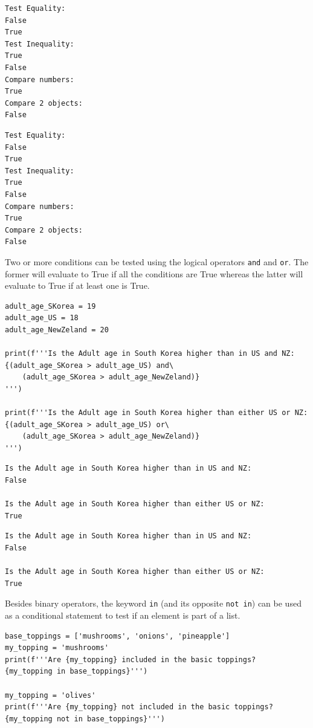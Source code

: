 \documentclass[10pt]{book}
\begin{document}
\label{org159f3d7}
\begin{verbatim}
Test Equality:
False
True
Test Inequality:
True
False
Compare numbers:
True
Compare 2 objects:
False
\end{verbatim}

\label{orgdbfd2e8}
\begin{verbatim}
Test Equality:
False
True
Test Inequality:
True
False
Compare numbers:
True
Compare 2 objects:
False
\end{verbatim}

Two or more conditions can be tested using the logical operators \texttt{and} and \texttt{or}. The former will evaluate to True if all the conditions are True whereas the latter will evaluate to True if at least one is True.

\label{org6384ff9}
\begin{verbatim}
adult_age_SKorea = 19
adult_age_US = 18
adult_age_NewZeland = 20

print(f'''Is the Adult age in South Korea higher than in US and NZ:
{(adult_age_SKorea > adult_age_US) and\
    (adult_age_SKorea > adult_age_NewZeland)}
''')

print(f'''Is the Adult age in South Korea higher than either US or NZ:
{(adult_age_SKorea > adult_age_US) or\
    (adult_age_SKorea > adult_age_NewZeland)}
''')
\end{verbatim}

\label{orgafae69b}
\begin{verbatim}
Is the Adult age in South Korea higher than in US and NZ:
False

Is the Adult age in South Korea higher than either US or NZ:
True

\end{verbatim}

\label{orge7f6848}
\begin{verbatim}
Is the Adult age in South Korea higher than in US and NZ:
False

Is the Adult age in South Korea higher than either US or NZ:
True

\end{verbatim}

Besides binary operators, the keyword \texttt{in} (and its opposite \texttt{not in}) can be used as a conditional statement to test if an element is part of a list.

\label{org802c21b}
\begin{verbatim}
base_toppings = ['mushrooms', 'onions', 'pineapple']
my_topping = 'mushrooms'
print(f'''Are {my_topping} included in the basic toppings?
{my_topping in base_toppings}''')

my_topping = 'olives'
print(f'''Are {my_topping} not included in the basic toppings?
{my_topping not in base_toppings}''')
\end{verbatim}
\end{document}
